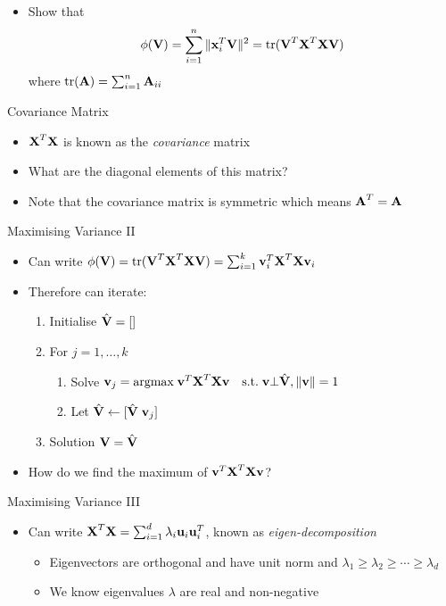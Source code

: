 \documentclass{beamer}
\begin{document}
\begin{frame} 
\begin{itemize}
 \item Show that 
 \begin{displaymath} 
 \phi(\textbf{V}) = \sum_{i=1}^n \|\textbf{x}_{i}^T\textbf{V} \|^2 = \mbox{tr}(\textbf{V}^T\textbf{X}^T\textbf{X}\textbf{V}) 
 \end{displaymath}
 where $\mbox{tr}(\textbf{A}) = \sum_{i=1}^n \textbf{A}_{ii}$
\end{itemize}

\end{frame}


\begin{frame}{Covariance Matrix}
\begin{itemize} 
 \item $\textbf{X}^T\textbf{X}$ is known as the \emph{covariance} matrix 
 \item What are the diagonal elements of this matrix? 
 \item Note that the covariance matrix is symmetric which means $\textbf{A}^T = \textbf{A}$
\end{itemize}
\end{frame}

\begin{frame}{Maximising Variance II} 
\begin{itemize} 
 \item Can write $\phi(\textbf{V}) = \mbox{tr}(\textbf{V}^T\textbf{X}^T\textbf{X}\textbf{V}) = \sum_{i=1}^k \textbf{v}_i^T\textbf{X}^T\textbf{X}\textbf{v}_i$
 \item Therefore can iterate:
 \begin{enumerate}
  \item Initialise $\hat{\textbf{V}} = []$
  \item For $j = 1, \ldots, k$
  \begin{enumerate}
  \item Solve $\textbf{v}_j = \mbox{argmax} \; \textbf{v}^T\textbf{X}^T\textbf{X}\textbf{v} \quad \mbox{s.t.} \;  \textbf{v} \bot \hat{\textbf{V}}, \|\textbf{v} \|  = 1$
  \item Let $\hat{\textbf{V}} \leftarrow [\hat{\textbf{V}} \; \textbf{v}_{j}]$
   \end{enumerate}
\item Solution $\textbf{V} = \hat{\textbf{V}}$
 \end{enumerate}
\item How do we find the maximum of $\textbf{v}^T\textbf{X}^T\textbf{X}\textbf{v}$? 
\end{itemize}
\end{frame}

\begin{frame}{Maximising Variance III}  
\begin{itemize} 
 \item Can write $\textbf{X}^T\textbf{X} = \sum_{i=1}^d \lambda_i \textbf{u}_i \textbf{u}_i^T$, known as \emph{eigen-decomposition}
  \begin{itemize} 
  \item Eigenvectors are orthogonal and have unit norm and $\lambda_1 \geq \lambda_2 \geq \cdots \geq \lambda_d$ 
  \item We know eigenvalues $\lambda$ are real and non-negative 
  \end{itemize} 
\end{itemize}
\end{frame}
\end{document}
